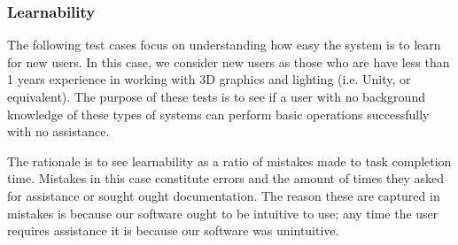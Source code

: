 \documentclass[12pt, titlepage]{article}
\begin{document}
\subsubsection{Learnability}
The following test cases focus on understanding how easy the system is to learn 
for new users. In this case, we consider new users as those who are have less 
than 1 years experience in working with 3D graphics and lighting (i.e. Unity, 
or equivalent). The purpose of these tests is to see if a user with no 
background knowledge of these types of systems can perform basic operations 
successfully with no assistance.

The rationale is to see learnability as a ratio of mistakes made to task 
completion time. Mistakes in this case constitute errors and the amount of 
times they asked for assistance or sought ought documentation. The reason these 
are captured in mistakes is because our software ought to be intuitive to use; 
any time the user requires assistance it is because our software was 
unintuitive.
\end{document}
